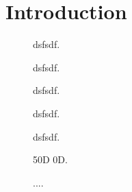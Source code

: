\section{Introduction}
\lipsum[5]

\begin{figure}[h]
	\centering
    
	\caption{dsfsdf.}
	\label{fig:bat_discharge}
\end{figure}

\begin{figure}[h]
	\centering
    
	\caption{dsfsdf.}
	\label{fig:bat_discharge}
\end{figure}


\begin{figure}[h]
	\centering
    
	\caption{dsfsdf.}
	\label{fig:controllerboardv2_startup}
\end{figure}



\begin{figure}[h]
	\centering
    
	\caption{dsfsdf.}
	\label{fig:controllerboardv2_shutdown}
\end{figure}

\begin{figure}[h]
	\centering
    
	\caption{dsfsdf.}
	\label{fig:controllerboardv2_inrushcurrent_charge}
\end{figure}




\begin{figure}[h]
	\centering
    
	\caption{50D 0D.}
	\label{fig:controllerboardv2_}
\end{figure}




\begin{figure}[h]
	\centering
    
	\caption{....}
	\label{fig:controllerboardv2_}
\end{figure}


